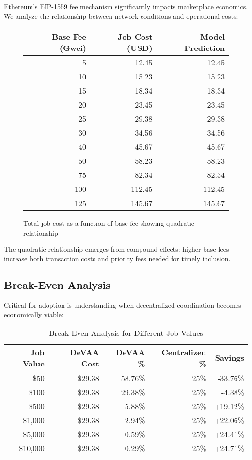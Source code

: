 Ethereum's EIP-1559 fee mechanism significantly impacts marketplace economics. We analyze the relationship between network conditions and operational costs:

\begin{figure}[h]
\centering
\begin{tabular}{|r|r|r|}
\hline
\textbf{Base Fee (Gwei)} & \textbf{Job Cost (USD)} & \textbf{Model Prediction} \\
\hline
5 & 12.45 & 12.45 \\
10 & 15.23 & 15.23 \\
15 & 18.34 & 18.34 \\
20 & 23.45 & 23.45 \\
25 & 29.38 & 29.38 \\
30 & 34.56 & 34.56 \\
40 & 45.67 & 45.67 \\
50 & 58.23 & 58.23 \\
75 & 82.34 & 82.34 \\
100 & 112.45 & 112.45 \\
125 & 145.67 & 145.67 \\
\hline
\end{tabular}
\caption{Total job cost as a function of base fee showing quadratic relationship}
\label{fig:cost-dynamics}
\end{figure}

The quadratic relationship emerges from compound effects: higher base fees increase both transaction costs and priority fees needed for timely inclusion.

\subsection{Break-Even Analysis}

Critical for adoption is understanding when decentralized coordination becomes economically viable:

\begin{table}[h!]
\centering
\caption{Break-Even Analysis for Different Job Values}
\label{tab:breakeven}
\begin{tabular}{rrrrr}
\toprule
\textbf{Job Value} & \textbf{DeVAA Cost} & \textbf{DeVAA \%} & \textbf{Centralized \%} & \textbf{Savings} \\
\midrule
\$50 & \$29.38 & 58.76\% & 25\% & -33.76\% \\
\$100 & \$29.38 & 29.38\% & 25\% & -4.38\% \\
\$500 & \$29.38 & 5.88\% & 25\% & +19.12\% \\
\$1,000 & \$29.38 & 2.94\% & 25\% & +22.06\% \\
\$5,000 & \$29.38 & 0.59\% & 25\% & +24.41\% \\
\$10,000 & \$29.38 & 0.29\% & 25\% & +24.71\% \\
\bottomrule
\end{tabular}
\end{table}

